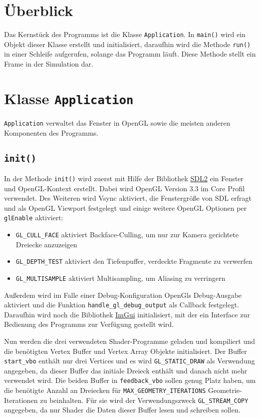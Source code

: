 \chapter{Überblick}
Das Kernstück des Programms ist die Klasse \lstinline{Application}. In \lstinline{main()} wird ein Objekt dieser Klasse erstellt und initialisiert, daraufhin wird die Methode \lstinline{run()} in einer Schleife aufgerufen, solange das Programm läuft. Diese Methode stellt ein Frame in der Simulation dar. 

\chapter{Klasse \lstinline{Application}}
\lstinline{Application} verwaltet das Fenster in OpenGL sowie die meisten anderen Komponenten des Programms. 

\section{\lstinline{init()}}
In der Methode \lstinline{init()} wird zuerst mit Hilfe der Bibliothek \href{https://www.libsdl.org/}{SDL2} ein Fenster und OpenGL-Kontext erstellt. Dabei wird OpenGL Version 3.3 im Core Profil verwendet. Des Weiteren wird Vsync aktiviert, die Fenstergröße von SDL erfragt und als OpenGL Viewport festgelegt und einige weitere OpenGL Optionen per \lstinline{glEnable} aktiviert:

\begin{itemize}
    \item \lstinline{GL_CULL_FACE} aktiviert Backface-Culling, um nur zur Kamera gerichtete Dreiecke anzuzeigen
    \item \lstinline{GL_DEPTH_TEST} aktiviert den Tiefenpuffer, verdeckte Fragmente zu verwerfen
    \item \lstinline{GL_MULTISAMPLE} aktiviert Multisampling, um Aliasing zu verringern
\end{itemize}

Außerdem wird im Falle einer Debug-Konfiguration OpenGls Debug-Ausgabe aktiviert und die Funktion \lstinline{handle_gl_debug_output} als Callback festgelegt. Daraufhin wird noch die Bibliothek \href{https://github.com/ocornut/imgui}{ImGui} initialisiert, mit der ein Interface zur Bedienung des Programms zur Verfügung gestellt wird.

Nun werden die drei verwendeten Shader-Programme geladen und kompiliert und die benötigten Vertex Buffer und Vertex Array Objekte initialisiert. Der Buffer \lstinline{start_vbo} enthält nur drei Vertices und es wird \lstinline{GL_STATIC_DRAW} als Verwendung angegeben, da dieser Buffer das initiale Dreieck enthält und danach nicht mehr verwendet wird. Die beiden Buffer in \lstinline{feedback_vbo} sollen genug Platz haben, um die benötigte Anzahl an Dreiecken für \lstinline{MAX_GEOMETRY_ITERATIONS} Geometrie-Iterationen zu beinhalten. Für sie wird der Verwendungszweck \lstinline{GL_STREAM_COPY} angegeben, da nur Shader die Daten dieser Buffer lesen und schreiben sollen.


